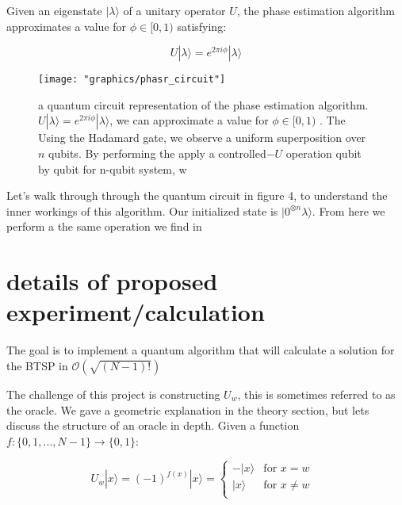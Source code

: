 \documentclass[twocolumn,showpacs,preprintnumbers,amsmath,amssymb]{revtex4}
\begin{document}
		
	    
		
		  Given an eigenstate $|\lambda \rangle$ of a unitary operator $U$, the phase estimation algorithm approximates a value for $\phi \in [0,1)$ satisfying:
		
		\begin{equation}
		 U |\lambda \rangle = e^{2\pi i \phi} |\lambda \rangle
	    \end{equation}
		\begin{figure}[!h]
			\centering
			\texttt{[image: "graphics/phasr\_circuit"]}
			\caption{a quantum circuit representation of the phase estimation algorithm. $ U |\lambda \rangle = e^{2\pi i \phi} |\lambda \rangle $, we can  approximate a value for $\phi \in [0,1)$ . The  Using the Hadamard gate, we observe a uniform superposition over $n$ qubits. By performing the apply a controlled$-U$ operation qubit by qubit for n-qubit system, w}
			\label{fig:phasrcircuit}
		\end{figure}
		
		
		Let's walk through through the quantum circuit in figure 4, to understand the inner workings of this algorithm.	 Our initialized state is $|0^{\otimes n} \lambda\rangle$. From here we perform a the same operation we find in 
		
		
		
		\section{details of proposed experiment/calculation}
		
		The goal is to implement a quantum algorithm that will calculate a solution for the BTSP in $\mathcal{O}(\sqrt{(N-1)!})$
		
		The challenge of this project is constructing $U_w$, this is sometimes referred to as the oracle. We gave a geometric explanation in the theory section, but lets discuss the structure of an oracle in depth. Given a function $f: \{0,1,...,N-1\} \rightarrow \{0,1\}$:
		
		\begin{equation}
			U_{w}|x\rangle = (-1)^{f(x)}|x\rangle = 
			\begin{cases}
				-|x\rangle & \text{for  $x=w$ }\\
				|x\rangle  & \text{for $x\neq w$}\\
			\end{cases}       
		\end{equation}
		
\end{document}
